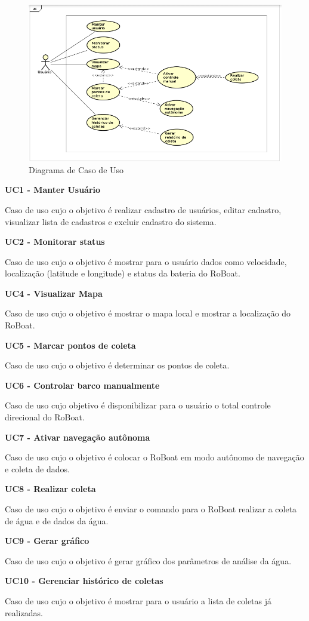  \begin{figure} [!htp]
	\centering
	\includegraphics[scale=0.6]{figuras/caso-de-uso.png}
	\caption{Diagrama de Caso de Uso}
	\label{fig:caso-de-uso}
\end{figure}
\FloatBarrier

\textbf{UC1 - Manter Usuário}

	Caso de uso cujo o objetivo é realizar cadastro de usuários, editar cadastro, visualizar lista de cadastros e excluir cadastro do sistema.

\textbf{UC2 - Monitorar status}

	Caso de uso cujo o objetivo é mostrar para o usuário dados como velocidade, localização (latitude e longitude) e status da bateria do RoBoat.

\textbf{UC4 - Visualizar Mapa}

	Caso de uso cujo o objetivo é mostrar o mapa local e mostrar a localização do RoBoat.

\textbf{UC5 - Marcar pontos de coleta}

	Caso de uso cujo o objetivo é determinar os pontos  de coleta.
	
\textbf{UC6 - Controlar barco manualmente}

	Caso de uso cujo objetivo é disponibilizar para o usuário o total controle direcional do RoBoat.

\textbf{UC7 - Ativar navegação autônoma}

	Caso de uso cujo o objetivo é colocar o RoBoat em modo autônomo de navegação e coleta de dados.

\textbf{UC8 - Realizar coleta}

	Caso de uso cujo o objetivo é enviar o comando para o RoBoat realizar a coleta de água e de dados da água.

\textbf{UC9 - Gerar gráfico}

	Caso de uso cujo o objetivo é gerar gráfico dos parâmetros de análise da água.

\textbf{UC10 - Gerenciar histórico de coletas}

	Caso de uso cujo o objetivo é mostrar para o usuário a lista de coletas já realizadas.
	
